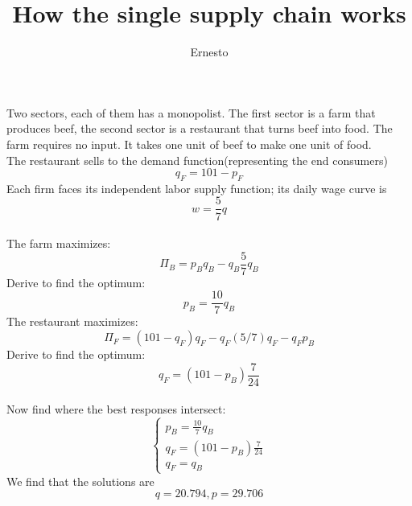 \documentclass[a4paper,12pt,english]{article}
\begin{document}
\title{How the single supply chain works}
\author{Ernesto}
\maketitle
Two sectors, each of them has a monopolist.
The first sector is a farm that produces beef, the second sector is a restaurant that turns beef into food. The farm requires no input.
It takes one unit of beef to make one unit of food. \\

The restaurant sells to the demand function(representing the end consumers) \[ q_F = 101 - p_F \]
Each firm faces its independent labor supply function; its daily wage curve is
\[ w= \frac{5}{7}q\] \\

The farm maximizes:
\[\Pi_B = p_B q_B - q_B \frac{5}{7}q_B \]
Derive to find the optimum:
\[ p_B = \frac{10}{7} q_B\]
The restaurant maximizes:
\[ \Pi_F = (101-q_F)q_F - q_F(5/7)q_F-q_F p_B\]
Derive to find the optimum:
\[ q_F = (101-p_B) \frac{7}{24} \] \\

Now find where the best responses intersect:
\[\begin{cases}
p_B = \frac{10}{7} q_B \\
 q_F = (101-p_B) \frac{7}{24} \\
 q_F = q_B
\end{cases}\]
We find that the solutions are 
\[ q = 20.794, p = 29.706\]
\end{document}
